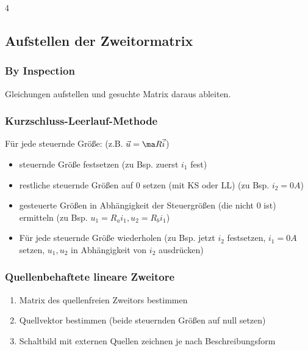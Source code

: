 \documentclass[fs, footer]{latex4ei}
\begin{document}
\begin{multicols*}{4}
    \subsection{Aufstellen der Zweitormatrix}
    \subsubsection{By Inspection}
    Gleichungen aufstellen und gesuchte Matrix daraus ableiten.
    \subsubsection{Kurzschluss-Leerlauf-Methode}
    Für jede steuernde Größe: (z.B. $\vec u = \ma R \vec i$)
    \begin{itemize}
        \item steuernde Größe festsetzen (zu Bsp. zuerst $i_1$ fest)
        \item restliche steuernde Größen auf 0 setzen (mit KS oder LL) (zu Bsp. $i_2=0A$)
        \item gesteuerte Größen in Abhängigkeit der Steuergrößen (die nicht 0 ist) ermitteln (zu Bsp. $u_1=R_a i_1, u_2=R_b i_1$)
        \item Für jede steuernde Größe wiederholen (zu Bsp. jetzt $i_2$ festsetzen, $i_1=0A$ setzen, $u_1, u_2$ in Abhängigkeit von $i_2$ ausdrücken)
    \end{itemize}
    \subsubsection{Quellenbehaftete lineare Zweitore}
    \begin{enumerate}\itemsep0pt
        \item Matrix des quellenfreien Zweitors bestimmen
        \item Quellvektor bestimmen (beide steuernden Größen auf null setzen)
        \item Schaltbild mit externen Quellen zeichnen je nach Beschreibungsform
    \end{enumerate}


\end{multicols*}
\end{document}
